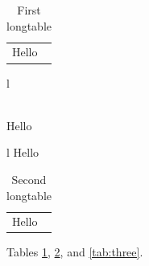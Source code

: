\documentclass{article}
\begin{document}
\listoftables

\begin{longtable}{l}
\caption{First longtable}\label{tab:one}\\
Hello\\
\end{longtable}

\begin{longtable*}{l}
\caption*{Unnumbered longtable}\\
Hello\\
\end{longtable*}

\begin{longtable*}{l}
Hello\\
\end{longtable*}

\begin{longtable}{l}
\caption{Second longtable}\label{tab:two}\\
Hello\\
\end{longtable}

\begin{table}
\caption{A plain table}\label{tab:three}
\end{table}

Tables \ref{tab:one}, \ref{tab:two}, and \ref{tab:three}.
\end{document}
